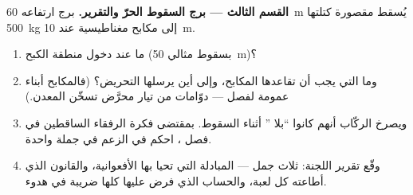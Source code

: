 \begin{problem}
\medskip\noindent\textbf{القسم الثالث --- برج السقوط الحرّ
والتقرير.}
برج ارتفاعه \qty{60}{m} يُسقط مقصورة كتلتها \qty{500}{kg} إلى
مكابح مغناطيسية عند \qty{10}{m}.
\begin{enumerate}[resume]
  \item ما  عند دخول منطقة الكبح (بسقوط مثالي
        \qty{50}{m})؟
  \item وما  التي يجب أن تقاعدها المكابح، وإلى أين
        يرسلها التحريض؟ (فالمكابح أبناء عمومة لفصل  --- دوّامات من تيار محرَّض تسخّن المعدن.)
  \item ويصرخ الركّاب أنهم كانوا ``بلا '' أثناء السقوط.
        بمقتضى فكرة الرفقاء الساقطين في فصل ، احكم في
        الزعم في جملة واحدة.
  \item وقّع تقرير اللجنة: ثلاث جمل --- المبادلة التي تحيا
        بها الأفعوانية، والقانون الذي أطاعته كل لعبة، والحساب
        الذي فرض عليها كلها ضريبة في هدوء.
\end{enumerate}
\end{problem}
